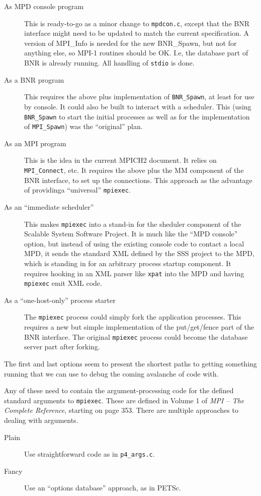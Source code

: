 \documentclass{article}
\def\code#1{\texttt{#1}}
\begin{document}
\begin{description}
\item[As MPD console program] This is ready-to-go as a minor change to
  \code{mpdcon.c}, except that the BNR interface might need to be updated to match
  the current specification.  A version of MPI_Info is needed for the new
  BNR_Spawn, but not for anything else, so MPI-1 routines should be OK.  I.e,
  the database part of BNR is already running.  All handling of \code{stdio}
  is done.
\item[As a BNR program] This requires the above plus implementation of
  \code{BNR_Spawn}, at least for use by console.  It could also be built to interact
  with a scheduler.  This (using \code{BNR_Spawn} to start the initial processes as
  well as for the implementation of \code{MPI_Spawn}) was the ``original''
  plan.
\item[As an MPI program] This is the idea in the current MPICH2 document.  It
  relies on \code{MPI_Connect}, etc.  It requires the above plus the MM component
  of the BNR interface, to set up the connections.  This approach as the
  advantage of providinga ``universal'' \code{mpiexec}. 
\item[As an ``immediate scheduler''] This makes \code{mpiexec} into a stand-in
  for the sheduler component of the Scalable System Software Project.  It is
  much like the ``MPD console'' option, but instead of using the existing
  console code to contact a local MPD, it sends the standard XML defined by
  the SSS project to the MPD, which is standing in for an arbitrary process
  startup component.  It requires hooking in an XML parser like \code{xpat}
  into the MPD and having \code{mpiexec} emit XML code.
\item[As a ``one-host-only'' process starter] The \code{mpiexec} process could
  simply fork the application processes.  This requires a new but simple
  implementation of the put/get/fence part of the BNR interface.  The original
  \code{mpiexec} process could become the database server part after forking.
\end{description}

The first and last options seem to present the shortest paths to getting
something running that we can use to debug the coming avalanche of code with.

Any of these need to contain the argument-processing code for the defined
standard arguments to \code{mpiexec}.  These are defined in Volume 1 of {\em
  MPI -- The Complete Reference}, starting on page 353.  There are multiple
approaches to dealing with arguments.
\begin{description}
\item[Plain] Use straightforward code as in \code{p4_args.c}.
\item[Fancy] Use an ``options database'' approach, as in PETSc.
\end{description}
\end{document}

